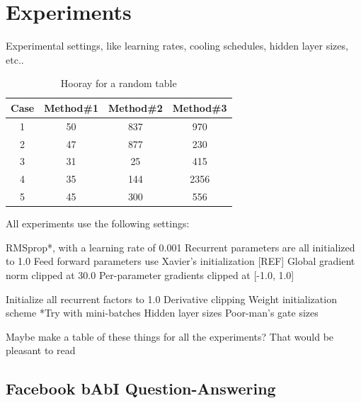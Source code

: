 \documentclass{article}
\begin{document}
%
%
\section{Experiments}
\label{others}
Experimental settings, like learning rates, cooling schedules, hidden layer sizes, etc..

\begin{table}[ht]
\caption{Hooray for a random table} %
\centering %
\begin{tabular}{c c c c} %
\hline\hline %
Case & Method\#1 & Method\#2 & Method\#3 \\ [0.5ex] %
\hline %
1 & 50 & 837 & 970 \\ %
2 & 47 & 877 & 230 \\
3 & 31 & 25 & 415 \\
4 & 35 & 144 & 2356 \\
5 & 45 & 300 & 556 \\ [1ex] %
\hline %
\end{tabular}
\label{table:nonlin} %
\end{table}

All experiments use the following settings:

RMSprop*, with a learning rate of 0.001
Recurrent parameters are all initialized to 1.0
Feed forward parameters use Xavier’s initialization [REF]
Global gradient norm clipped at 30.0
Per-parameter gradients clipped at [-1.0, 1.0]

Initialize all recurrent factors to 1.0
Derivative clipping
Weight initialization scheme
*Try with mini-batches
Hidden layer sizes
Poor-man’s gate sizes

Maybe make a table of these things for all the experiments? That would be pleasant to read

\subsection{Facebook bAbI Question-Answering}
\end{document}
